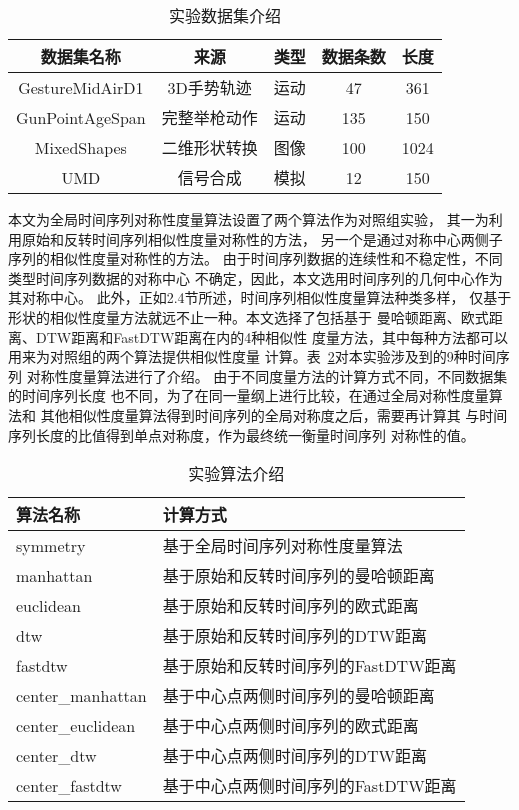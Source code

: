 \begin{table}
  \centering
  \caption{实验数据集介绍}
  \begin{tabular}{ccccc}
    \toprule
    数据集名称      & 来源         & 类型 & 数据条数 & 长度 \\
    \midrule
    GestureMidAirD1 & 3D手势轨迹   & 运动 & 47       & 361  \\
    GunPointAgeSpan & 完整举枪动作 & 运动 & 135      & 150  \\
    MixedShapes     & 二维形状转换 & 图像 & 100      & 1024 \\
    UMD             & 信号合成     & 模拟 & 12       & 150  \\
    \bottomrule
  \end{tabular}
  \label{tab:experiment_dataset}
\end{table}

本文为全局时间序列对称性度量算法设置了两个算法作为对照组实验，
其一为利用原始和反转时间序列相似性度量对称性的方法，
另一个是通过对称中心两侧子序列的相似性度量对称性的方法。
由于时间序列数据的连续性和不稳定性，不同类型时间序列数据的对称中心
不确定，因此，本文选用时间序列的几何中心作为其对称中心。
此外，正如2.4节所述，时间序列相似性度量算法种类多样，
仅基于形状的相似性度量方法就远不止一种。本文选择了包括基于
曼哈顿距离、欧式距离、DTW距离和FastDTW距离在内的4种相似性
度量方法，其中每种方法都可以用来为对照组的两个算法提供相似性度量
计算。表~\ref{tab:experiment_algorithm}对本实验涉及到的9种时间序列
对称性度量算法进行了介绍。
由于不同度量方法的计算方式不同，不同数据集的时间序列长度
也不同，为了在同一量纲上进行比较，在通过全局对称性度量算法和
其他相似性度量算法得到时间序列的全局对称度之后，需要再计算其
与时间序列长度的比值得到单点对称度，作为最终统一衡量时间序列
对称性的值。
\begin{table}
  \centering
  \caption{实验算法介绍}
  \begin{tabular}{ll}
    \toprule
    算法名称          & 计算方式                            \\
    \midrule
    symmetry          & 基于全局时间序列对称性度量算法      \\
    manhattan         & 基于原始和反转时间序列的曼哈顿距离  \\
    euclidean         & 基于原始和反转时间序列的欧式距离    \\
    dtw               & 基于原始和反转时间序列的DTW距离     \\
    fastdtw           & 基于原始和反转时间序列的FastDTW距离  \\
    center\_manhattan & 基于中心点两侧时间序列的曼哈顿距离   \\
    center\_euclidean & 基于中心点两侧时间序列的欧式距离     \\
    center\_dtw       & 基于中心点两侧时间序列的DTW距离     \\
    center\_fastdtw   & 基于中心点两侧时间序列的FastDTW距离 \\
    \bottomrule
  \end{tabular}
  \label{tab:experiment_algorithm}
\end{table}

